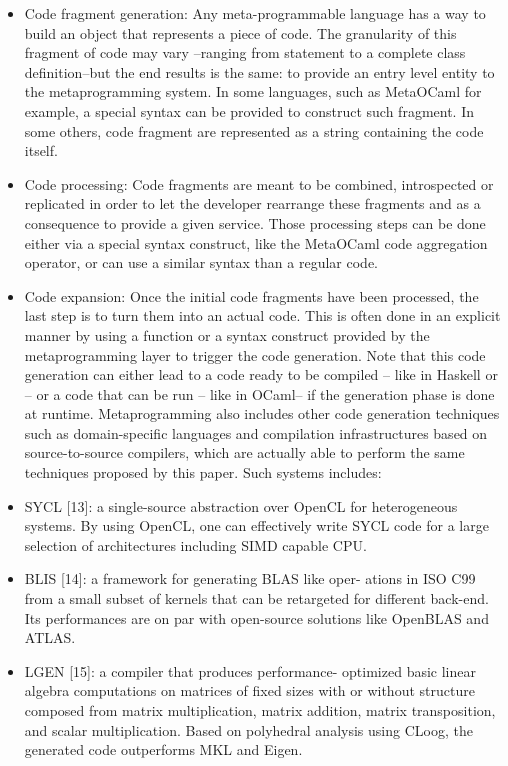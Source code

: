 \documentclass[../../main.tex]{subfiles}
\begin{document}
\begin{itemize}
\item Code fragment generation: Any meta-programmable
language has a way to build an object that represents a
piece of code. The granularity of this fragment of code
may vary –ranging from statement to a complete class
definition–but the end results is the same: to provide
an entry level entity to the metaprogramming system.
In some languages, such as MetaOCaml for example,
a special syntax can be provided to construct such
fragment. In some others, code fragment are represented
as a string containing the code itself.

\item Code processing: Code fragments are meant to
be combined, introspected or replicated in order to
let the developer rearrange these fragments and as a
consequence to provide a given service. Those processing
steps can be done either via a special syntax construct,
like the MetaOCaml code aggregation operator, or can
use a similar syntax than a regular code.

\item Code expansion: Once the initial code fragments have
been processed, the last step is to turn them into an
actual code. This is often done in an explicit manner by
using a function or a syntax construct provided by the
metaprogramming layer to trigger the code generation.
Note that this code generation can either lead to a code
ready to be compiled – like in Haskell or \cpp– or a
code that can be run – like in OCaml– if the generation
phase is done at runtime.
Metaprogramming also includes other code generation
techniques such as domain-specific languages and compilation
infrastructures based on source-to-source compilers, which
are actually able to perform the same techniques proposed by
this paper. Such systems includes:

\item SYCL [13]: a single-source abstraction over OpenCL
for heterogeneous systems. By using OpenCL, one can
effectively write SYCL code for a large selection of
architectures including SIMD capable CPU.

\item BLIS [14]: a framework for generating BLAS like oper-
ations in ISO C99 from a small subset of kernels that can
be retargeted for different back-end. Its performances are
on par with open-source solutions like OpenBLAS and
ATLAS.

\item LGEN [15]: a compiler that produces performance-
optimized basic linear algebra computations on matrices
of fixed sizes with or without structure composed
from matrix multiplication, matrix addition, matrix
transposition, and scalar multiplication. Based on
polyhedral analysis using CLoog, the generated code
outperforms MKL and Eigen.
\end{itemize}
\end{document}
